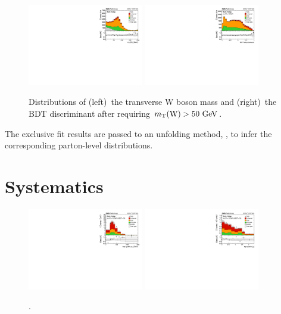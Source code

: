 \documentclass[12pt]{article}
\begin{document}
\begin{figure}[th]
\begin{center}
\includegraphics[width=0.45\textwidth]{figures/fit/reco_mtw.pdf}\hspace{0.05\textwidth}
\includegraphics[width=0.45\textwidth]{figures/fit/reco_BDT.pdf}
\end{center}

\caption{\label{fig:mtwbdt}Distributions of (left)~the transverse W boson mass and (right)~the BDT discriminant after requiring $m_{\mathrm{T}}(\mathrm{W})>50~\mathrm{GeV}$.}
\end{figure}

The exclusive fit results are passed to an unfolding method, \tunfold, to infer the corresponding parton-level distributions.

\section{Systematics}

\begin{figure}[th]
\begin{center}
\includegraphics[width=0.45\textwidth]{figures/unfolding/reco_toppt_bdt.pdf}\hspace{0.05\textwidth}
\includegraphics[width=0.45\textwidth]{figures/unfolding/reco_topy_bdt.pdf}
\end{center}

\caption{.}
\end{figure}
\end{document}
